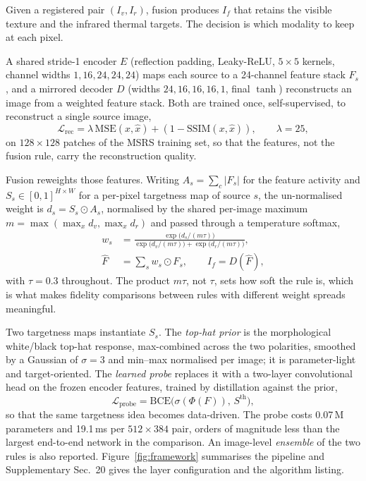 \documentclass[journal]{IEEEtran}
\begin{document}
\begin{sloppypar}
Given a registered pair $(I_v,I_r)$, fusion produces $I_f$ that retains the visible
texture and the infrared thermal targets. The decision is which modality to keep at
each pixel.

A shared stride-1 encoder $E$ (reflection padding, Leaky-ReLU, $5\times5$ kernels,
channel widths $1,16,24,24,24$) maps each source to a 24-channel feature stack
$F_s$, and a mirrored decoder $D$ (widths $24,16,16,16,1$, final $\tanh$) reconstructs
an image from a weighted feature stack. Both are trained once, self-supervised, to
reconstruct a single source image,
\begin{equation}
\mathcal{L}_{\mathrm{rec}} = \lambda\,\mathrm{MSE}(x,\hat{x}) + (1-\mathrm{SSIM}(x,\hat{x})),\qquad \lambda=25,
\end{equation}
on $128\times128$ patches of the MSRS training set, so that the features, not the
fusion rule, carry the reconstruction quality.

Fusion reweights those features. Writing $A_s=\sum_c|F_s|$ for the feature activity and
$S_s\in[0,1]^{H\times W}$ for a per-pixel targetness map of source $s$, the
un-normalised weight is $d_s=S_s\odot A_s$, normalised by the shared per-image maximum
$m=\max(\max_x d_v,\max_x d_r)$ and passed through a temperature softmax,
\begin{equation}
\begin{aligned}
w_s&=\frac{\exp\!\big(d_s/(m\tau)\big)}
{\exp\!\big(d_v/(m\tau)\big)+\exp\!\big(d_r/(m\tau)\big)},\\
\hat{F}&=\sum_s w_s\odot F_s,\qquad I_f=D(\hat{F}),
\end{aligned}
\label{eq:rule}
\end{equation}
with $\tau=0.3$ throughout. The product $m\tau$, not $\tau$, sets how soft the rule
is, which is what makes fidelity comparisons between rules with different weight
spreads meaningful.

Two targetness maps instantiate $S_s$. The \emph{top-hat prior} is the morphological
white/black top-hat response, max-combined across the two polarities, smoothed by a
Gaussian of $\sigma=3$ and min--max normalised per image; it is parameter-light and
target-oriented. The \emph{learned probe} replaces it with a two-layer convolutional
head on the frozen encoder features, trained by distillation against the prior,
\begin{equation}
\mathcal{L}_{\mathrm{probe}}=\mathrm{BCE}\big(\sigma(\Phi(F)),\,S^{\mathrm{th}}\big),
\end{equation}
so that the same targetness idea becomes data-driven. The probe costs 0.07\,M
parameters and 19.1\,ms per $512\times384$ pair, orders of magnitude less than the
largest end-to-end network in the comparison. An image-level \emph{ensemble} of the
two rules is also reported. Figure~\ref{fig:framework} summarises the pipeline and
Supplementary Sec.~20 gives the layer configuration and the algorithm listing.
\end{sloppypar}
\end{document}
